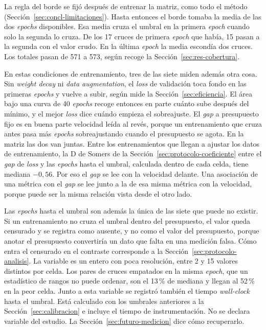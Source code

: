La regla del borde se fijó después de entrenar la matriz, como todo el método (Sección~\ref{sec:concl-limitaciones}). Hasta entonces el borde tomaba la media de las dos \emph{epochs} disponibles. Esa media cruza el umbral en la primera \emph{epoch} cuando solo la segunda lo cruza. De los 17 cruces de primera \emph{epoch} que había, 15 pasan a la segunda con el valor crudo. En la última \emph{epoch} la media escondía dos cruces. Los totales pasan de 571 a 573, según recoge la Sección~\ref{sec:res-cobertura}.

En estas condiciones de entrenamiento, tres de las siete miden además otra cosa. Sin \emph{weight decay} ni \emph{data augmentation}, el \emph{loss} de validación toca fondo en las primeras \emph{epochs} y vuelve a subir, según mide la Sección~\ref{sec:eficiencia}. El área bajo una curva de 40 \emph{epochs} recoge entonces en parte cuánto sube después del mínimo, y el mejor \emph{loss} dice cuándo empieza el sobreajuste. El \emph{gap} a presupuesto fijo es en buena parte velocidad leída al revés, porque un entrenamiento que cruza antes pasa más \emph{epochs} sobreajustando cuando el presupuesto se agota. En la matriz las dos van juntas. Entre los entrenamientos que llegan a ajustar los datos de entrenamiento, la D de Somers de la Sección~\ref{sec:protocolo-coeficiente} entre el \emph{gap} de \emph{loss} y las \emph{epochs} hasta el umbral, calculada dentro de cada celda, tiene mediana $-0{,}56$. Por eso el \emph{gap} se lee con la velocidad delante. Una asociación de una métrica con el \emph{gap} se lee junto a la de esa misma métrica con la velocidad, porque puede ser la misma relación vista desde el otro lado.

Las \emph{epochs} hasta el umbral son además la única de las siete que puede no existir. Si un entrenamiento no cruza el umbral dentro del presupuesto, el valor queda censurado y se registra como ausente, y no como el valor del presupuesto, porque anotar el presupuesto convertiría un dato que falta en una medición falsa. Cómo entra el censurado en el contraste corresponde a la Sección~\ref{sec:protocolo-analisis}. La variable es un entero con poca resolución, entre 2 y 15 valores distintos por celda. Los pares de cruces empatados en la misma \emph{epoch}, que un estadístico de rangos no puede ordenar, son el 13\,\% de mediana y llegan al 52\,\% en la peor celda. Junto a esta variable se registró también el tiempo \emph{wall-clock} hasta el umbral. Está calculado con los umbrales anteriores a la Sección~\ref{sec:calibracion} e incluye el tiempo de instrumentación. No se declara variable del estudio. La Sección~\ref{sec:futuro-medicion} dice cómo recuperarlo.

